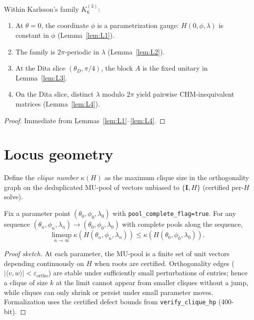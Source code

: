 \begin{theorem}
\label{thm:T1}
Within Karlsson's family $K_6^{(3)}$:
\begin{enumerate}
    \item At $\theta=0$, the coordinate $\phi$ is a parametrization gauge: $H(0,\phi,\lambda)$ is constant in $\phi$ (Lemma~\ref{lem:L1}).
    \item The family is $2\pi$-periodic in $\lambda$ (Lemma~\ref{lem:L2}).
    \item At the Dita slice $(\theta_D,\pi/4)$, the block $A$ is the fixed unitary in Lemma~\ref{lem:L3}.
    \item On the Dita slice, distinct $\lambda$ modulo $2\pi$ yield pairwise CHM-inequivalent matrices (Lemma~\ref{lem:L4}).
\end{enumerate}
\end{theorem}

\begin{proof}
Immediate from Lemmas~\ref{lem:L1}--\ref{lem:L4}.
\end{proof}

\section{Locus geometry}
\label{sec:proof-locus}

Define the \emph{clique number} $\kappa(H)$ as the maximum clique size in the orthogonality graph on the
deduplicated MU-pool of vectors unbiased to $\{\mathbf{I},H\}$ (certified per-$H$ solve).

\begin{lemma}
\label{lem:L5-semicont}
Fix a parameter point $(\theta_0,\phi_0,\lambda_0)$ with \texttt{pool\_complete\_flag=true}.
For any sequence $(\theta_n,\phi_n,\lambda_n)\to(\theta_0,\phi_0,\lambda_0)$ with complete pools along the sequence,
\[
\limsup_{n\to\infty}\kappa(H(\theta_n,\phi_n,\lambda_n))\le \kappa(H(\theta_0,\phi_0,\lambda_0)).
\]
\end{lemma}

\begin{proof}[Proof sketch]
At each parameter, the MU-pool is a finite set of unit vectors depending continuously on $H$ when roots are certified.
Orthogonality edges ($|\langle v,w\rangle|<\varepsilon_{\mathrm{ortho}}$) are stable under sufficiently small perturbations of entries;
hence a clique of size $k$ at the limit cannot appear from smaller cliques without a jump, while cliques can only shrink or persist under small parameter moves.
Formalization uses the certified defect bounds from \texttt{verify\_clique\_hp} (400-bit).
\end{proof}

